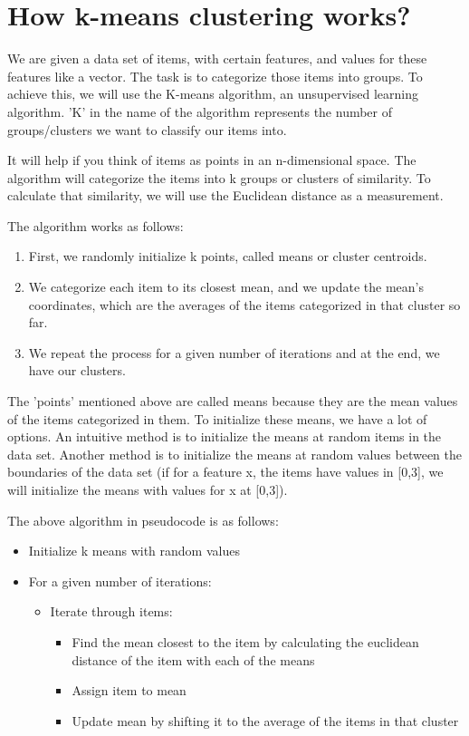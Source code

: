 \section{How k-means clustering works?}
    We are given a data set of items, with certain features, and values for these features like a vector. The task is to categorize those items into groups. To achieve this, we will use the K-means algorithm, an unsupervised learning algorithm. 'K' in the name of the algorithm represents the number of groups/clusters we want to classify our items into.

    It will help if you think of items as points in an n-dimensional space. The algorithm will categorize the items into k groups or clusters of similarity. To calculate that similarity, we will use the Euclidean distance as a measurement.

    The algorithm works as follows:  
    \begin{enumerate}
        \item First, we randomly initialize k points, called means or cluster centroids.
        \item We categorize each item to its closest mean, and we update the mean's coordinates, which are the averages of the items categorized in that cluster so far.
        \item We repeat the process for a given number of iterations and at the end, we have our clusters.
    \end{enumerate}
    The 'points' mentioned above are called means because they are the mean values of the items categorized in them. To initialize these means, we have a lot of options. An intuitive method is to initialize the means at random items in the data set. Another method is to initialize the means at random values between the boundaries of the data set (if for a feature x, the items have values in [0,3], we will initialize the means with values for x at [0,3]).

    The above algorithm in pseudocode is as follows:
    \begin{itemize}
        \item Initialize k means with random values
        \item For a given number of iterations:
            \begin{itemize}
                \item Iterate through items:
                    \begin{itemize}
                        \item Find the mean closest to the item by calculating the euclidean distance of the item with each of the means
                        \item Assign item to mean
                        \item Update mean by shifting it to the average of the items in that cluster
                    \end{itemize}
            \end{itemize}
    \end{itemize}